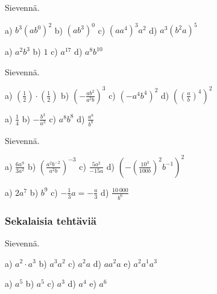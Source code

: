 Sievennä.
 \begin{tehtava}
        a) $b^3(ab^0)^2$ \qquad
        b) $(ab^3)^0$ \qquad
        c) $(aa^4)^3a^2$ \qquad
        d) $a^3(b^2a)^5$

        \begin{vastaus}
            a) $a^2b^3$ \qquad
            b) $1$ \qquad
            c) $a^{17}$ \qquad
            d) $a^8b^{10}$
        \end{vastaus}
    \end{tehtava}

Sievennä.
 \begin{tehtava}
        a) $(\frac{1}{2})\cdot(\frac{1}{2})$ \qquad
        b) $(-\frac{ab^2}{a^2b})^3$ \qquad
        c) $(-a^4b^4)^2$ \qquad
        d) $\left((\frac{a}{b})^4\right)^2$
        
        \begin{vastaus}
            a) $\frac{1}{4}$ \qquad
            b) $-\frac{b^3}{a^3}$ \qquad
            c) $a^8b^8$ \qquad
            d) $\frac{a^8}{b^8}$
        \end{vastaus}
    \end{tehtava}
    
Sievennä.
    \begin{tehtava}
        a) $\frac{6a^9}{3a^2}$ \qquad
        b) $(\frac{a^2b^{-2}}{a^2b})^{-3}$ \qquad
        c) $\frac{5a^2}{-15a}$ \qquad
        d) $\left(-(\frac{10^3}{100b})^2 b^{-1} \right )^2$
        
        \begin{vastaus}
            a) $2a^7$ \qquad
            b) $b^9$ \qquad
            c) $-\frac{1}{3}a = -\frac{a}{3}$ \qquad
            d) $\frac{10\ 000}{b^6}$
        \end{vastaus}
    \end{tehtava}


\subsubsection*{Sekalaisia tehtäviä}

      Sievennä.
    
    \begin{tehtava}
        a) $a^2\cdot a^3$ \qquad
        b) $a^3a^2$ \qquad
        c) $a^2 a$ \qquad
        d) $a a^2 a$ \qquad
        e) $a^2a^1a^3$
        
        \begin{vastaus}
            a) $a^5$ \qquad
            b) $a^5$ \qquad
            c) $a^3$ \qquad
            d) $a^4$ \qquad
            e) $a^6$
        \end{vastaus}
    \end{tehtava}
    
